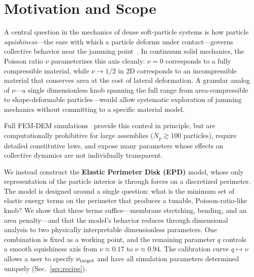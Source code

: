 \documentclass[aps,pre,twocolumn,floatfix,longbibliography]{revtex4-2}
\begin{document}
\maketitle

\section{Motivation and Scope}
\label{sec:motivation}

A central question in the mechanics of dense soft-particle systems is how particle
\emph{squishiness}---the ease with which a particle deforms under contact---governs
collective behavior near the jamming point~\cite{OHern2003,vanHecke2010}.  In
continuum solid mechanics, the Poisson ratio $\nu$ parameterizes this axis cleanly:
$\nu = 0$ corresponds to a fully compressible material, while $\nu \to 1/2$ in 2D
corresponds to an incompressible material that conserves area at the cost of lateral
deformation.  A granular analog of $\nu$---a single dimensionless knob spanning the
full range from area-compressible to shape-deformable particles---would allow
systematic exploration of jamming mechanics without committing to a specific material
model.

Full FEM-DEM simulations~\cite{Li2020IPC,Treado2021} provide this control in
principle, but are computationally prohibitive for large assemblies
($N_p \gtrsim 100$ particles), require detailed constitutive laws, and expose many
parameters whose effects on collective dynamics are not individually transparent.

We instead construct the \textbf{Elastic Perimeter Disk (EPD)} model, whose only
representation of the particle interior is through forces on a discretized perimeter.
The model is designed around a single question: what is the minimum set of elastic
energy terms on the perimeter that produces a tunable, Poisson-ratio-like knob?  We
show that three terms suffice---membrane stretching, bending, and an area
penalty---and that the model's behavior reduces through dimensional analysis to two
physically interpretable dimensionless parameters.  One combination is fixed as a
working point, and the remaining parameter $q$ controls a smooth squishiness axis from
$\nu \approx 0.17$ to $\nu \approx 0.94$.  The calibration curve $q \mapsto \nu$
allows a user to specify $\nu_{\rm target}$ and have all simulation parameters
determined uniquely (Sec.~\ref{sec:recipe}).
\end{document}
